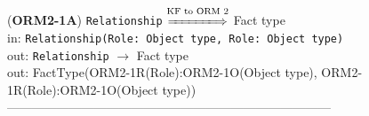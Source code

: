 \documentclass[sn-mathphys]{sn-jnl}
\begin{document}
{{{{({\bf ORM2-1A}) {\tt Relationship} $\overset{\text{KF to ORM 2}}{\xLongrightarrow{\hspace*{1.4cm}}}$ {Fact type}\\
\hspace*{0.3cm}in: {\tt Relationship(Role: Object type, Role: Object type)} \\
\hspace*{0.5cm}out:  {\tt Relationship} $\rightarrow$ {Fact type}\\
\hspace*{0.5cm}out:  {FactType(ORM2-1R(Role):ORM2-1O(Object type), ORM2-1R(Role):ORM2-1O(Object type))}\\




------------------------------------------------------------------------------
\\ 



}}}}
\end{document}
